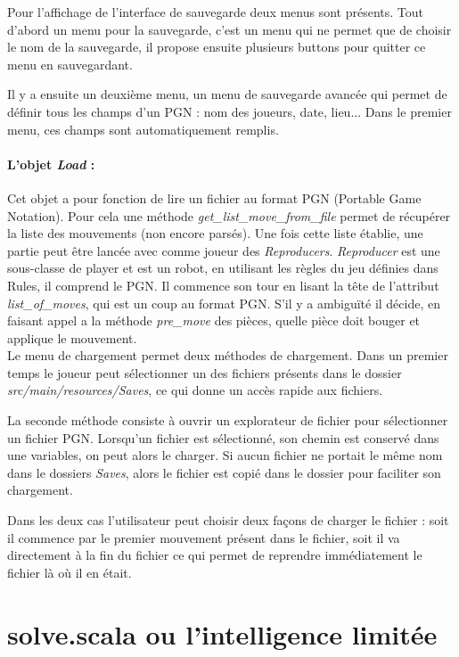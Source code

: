 \documentclass[a4paper]{article}
\begin{document}
Pour l'affichage de l'interface de sauvegarde deux menus sont présents. Tout d'abord un menu pour la sauvegarde, c'est un menu qui ne permet que de choisir le nom de la sauvegarde, il propose ensuite plusieurs buttons pour quitter ce menu en sauvegardant. 

Il y a ensuite un deuxième menu, un menu de sauvegarde avancée qui permet de définir tous les champs d'un PGN : nom des joueurs, date, lieu... Dans le premier menu, ces champs sont automatiquement remplis.

\paragraph{L'objet \textit{Load} :} Cet objet a pour fonction de lire un fichier au format PGN (Portable Game Notation). Pour cela une méthode \textit{get\_list\_move\_from\_file} permet de récupérer la liste des mouvements (non encore parsés). Une fois cette liste établie, une partie peut être lancée avec comme joueur des \textit{Reproducers}. \textit{Reproducer} est une sous-classe de player et est un robot, en utilisant les règles du jeu définies dans Rules, il comprend le PGN. Il commence son tour en lisant la tête de l'attribut \textit{list\_of\_moves}, qui est un coup au format PGN. S'il y a ambiguïté il décide, en faisant appel a la méthode \textit{pre\_move} des pièces, quelle pièce doit bouger et applique le mouvement. \\

Le menu de chargement permet deux méthodes de chargement. Dans un premier temps le joueur peut sélectionner un des fichiers présents dans le dossier \textit{src/main/resources/Saves}, ce qui donne un accès rapide aux fichiers. 

La seconde méthode consiste à ouvrir un explorateur de fichier pour sélectionner un fichier PGN. Lorsqu'un fichier est sélectionné, son chemin est conservé dans une variables, on peut alors le charger. Si aucun fichier ne portait le même nom dans le dossiers \textit{Saves}, alors le fichier est copié dans le dossier pour faciliter son chargement. 

Dans les deux cas l'utilisateur peut choisir deux façons de charger le fichier : soit il commence par le premier mouvement présent dans le fichier, soit il va directement à la fin du fichier ce qui permet de reprendre immédiatement le fichier là où il en était. 

\section{solve.scala ou l'intelligence limitée}
\end{document}
